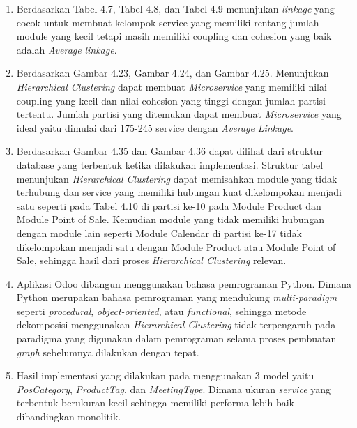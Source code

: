 \begin{enumerate}[nolistsep,leftmargin=0.5cm]
    \item Berdasarkan Tabel 4.7,  Tabel 4.8, dan Tabel 4.9 menunjukan \textit{linkage} yang cocok untuk membuat kelompok service yang memiliki rentang jumlah module yang kecil tetapi masih memiliki coupling dan cohesion yang baik adalah \textit{Average} \textit{linkage}.
    \item Berdasarkan Gambar 4.23, Gambar 4.24,  dan Gambar 4.25. Menunjukan \textit{Hierarchical Clustering} dapat membuat \textit{Microservice} yang memiliki nilai coupling yang kecil dan nilai cohesion yang tinggi dengan jumlah partisi tertentu. Jumlah partisi yang ditemukan dapat membuat \textit{Microservice} yang ideal yaitu dimulai dari 175-245 service dengan \textit{Average} \textit{Linkage}. 
    \item Berdasarkan Gambar 4.35  dan Gambar 4.36 dapat dilihat dari struktur database yang terbentuk ketika dilakukan implementasi. Struktur tabel menunjukan \textit{Hierarchical Clustering} dapat memisahkan module yang tidak terhubung dan service yang memiliki hubungan kuat dikelompokan menjadi satu seperti pada Tabel 4.10 di partisi ke-10 pada Module Product dan Module Point of Sale. Kemudian module yang tidak memiliki hubungan dengan module lain seperti Module Calendar di partisi ke-17 tidak dikelompokan menjadi satu dengan Module Product atau Module Point of Sale, sehingga hasil dari proses \textit{Hierarchical Clustering} relevan.
    \item Aplikasi Odoo dibangun menggunakan bahasa pemrograman Python. Dimana Python merupakan bahasa pemrograman yang mendukung  \textit{multi-paradigm} seperti \textit{procedural}, \textit{object-oriented}, atau \textit{functional}, sehingga  metode dekomposisi menggunakan \textit{Hierarchical Clustering} tidak terpengaruh pada paradigma yang digunakan dalam pemrograman selama proses pembuatan \textit{graph} sebelumnya dilakukan dengan tepat. 
    \item Hasil implementasi yang dilakukan pada menggunakan 3 model yaitu \textit{PosCategory}, \textit{ProductTag}, dan \textit{MeetingType}. Dimana ukuran \textit{service} yang terbentuk berukuran kecil sehingga memiliki performa lebih baik dibandingkan monolitik.\\
    
\end{enumerate}


